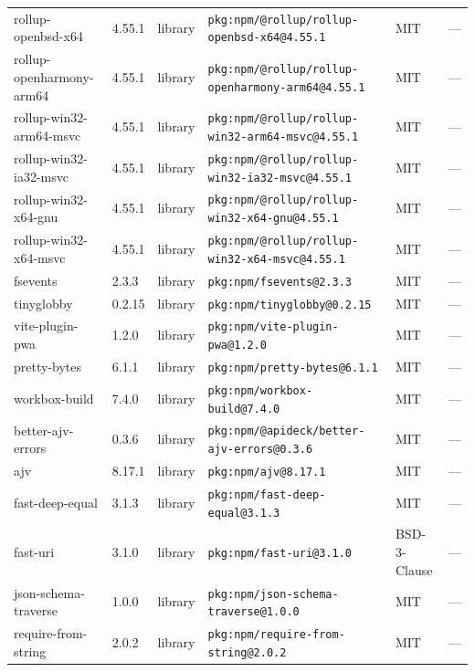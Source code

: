 \documentclass[11pt,a4paper]{article}
\begin{document}
\begin{longtable}{|p{4cm}|p{2cm}|p{1.6cm}|p{5cm}|p{1.5cm}|p{3.5cm}|}
\raggedright rollup-openbsd-x64 & 4.55.1 & library & \small\texttt{pkg:npm/@rollup/rollup-openbsd-x64@4.55.1} & MIT & \small — \\
\raggedright rollup-openharmony-arm64 & 4.55.1 & library & \small\texttt{pkg:npm/@rollup/rollup-openharmony-arm64@4.55.1} & MIT & \small — \\
\raggedright rollup-win32-arm64-msvc & 4.55.1 & library & \small\texttt{pkg:npm/@rollup/rollup-win32-arm64-msvc@4.55.1} & MIT & \small — \\
\raggedright rollup-win32-ia32-msvc & 4.55.1 & library & \small\texttt{pkg:npm/@rollup/rollup-win32-ia32-msvc@4.55.1} & MIT & \small — \\
\raggedright rollup-win32-x64-gnu & 4.55.1 & library & \small\texttt{pkg:npm/@rollup/rollup-win32-x64-gnu@4.55.1} & MIT & \small — \\
\raggedright rollup-win32-x64-msvc & 4.55.1 & library & \small\texttt{pkg:npm/@rollup/rollup-win32-x64-msvc@4.55.1} & MIT & \small — \\
\raggedright fsevents & 2.3.3 & library & \small\texttt{pkg:npm/fsevents@2.3.3} & MIT & \small — \\
\raggedright tinyglobby & 0.2.15 & library & \small\texttt{pkg:npm/tinyglobby@0.2.15} & MIT & \small — \\
\raggedright vite-plugin-pwa & 1.2.0 & library & \small\texttt{pkg:npm/vite-plugin-pwa@1.2.0} & MIT & \small — \\
\raggedright pretty-bytes & 6.1.1 & library & \small\texttt{pkg:npm/pretty-bytes@6.1.1} & MIT & \small — \\
\raggedright workbox-build & 7.4.0 & library & \small\texttt{pkg:npm/workbox-build@7.4.0} & MIT & \small — \\
\raggedright better-ajv-errors & 0.3.6 & library & \small\texttt{pkg:npm/@apideck/better-ajv-errors@0.3.6} & MIT & \small — \\
\raggedright ajv & 8.17.1 & library & \small\texttt{pkg:npm/ajv@8.17.1} & MIT & \small — \\
\raggedright fast-deep-equal & 3.1.3 & library & \small\texttt{pkg:npm/fast-deep-equal@3.1.3} & MIT & \small — \\
\raggedright fast-uri & 3.1.0 & library & \small\texttt{pkg:npm/fast-uri@3.1.0} & BSD-3-Clause & \small — \\
\raggedright json-schema-traverse & 1.0.0 & library & \small\texttt{pkg:npm/json-schema-traverse@1.0.0} & MIT & \small — \\
\raggedright require-from-string & 2.0.2 & library & \small\texttt{pkg:npm/require-from-string@2.0.2} & MIT & \small — \\

\end{longtable}
\end{document}
